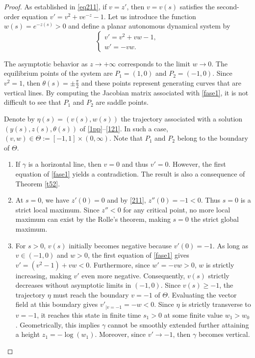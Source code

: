 \documentclass[a4paper,12pt]{amsart}
\theoremstyle{plain}
\theoremstyle{definition}
\begin{document}
\begin{proof} 
As established in \eqref{eq211}, if $v=z'$, then $v=v(s)$ satisfies the second-order equation $v' = v^2 + v e^{-z} - 1$. Let us introduce the function $w(s) = e^{-z(s)} > 0$ and define a planar autonomous dynamical system by 
\begin{equation}\label{fase1}
\begin{cases}
v' = v^2 + vw - 1, \\
w' = -vw.
\end{cases}
\end{equation}
 
 The asymptotic behavior as $z \to +\infty$ corresponds to the limit $w \to 0$. The equilibrium points of the system are $P_1 = (1, 0)$ and $P_2 = (-1, 0)$. Since $v^2=1$, then $\theta(s)=\pm\frac{\pi}{2}$ and these points represent generating curves that are vertical lines. By computing the Jacobian matrix associated with \eqref{fase1}, it is not difficult to see that $P_1$ and $P_2$ are saddle points. 
 


Denote by $\eta(s)=(v(s),w(s))$ the trajectory associated with a solution $(y(s),z(s),\theta(s))$ of \eqref{1pp}--\eqref{121}. In such a case, $(v,w)\in \Theta:=[-1,1]\times (0,\infty)$. Note that $P_1$ and $P_2$ belong to the boundary of $\Theta$.
\begin{enumerate}
\item If $\gamma$ is a horizontal line, then $v = 0$ and thus $v' = 0$. However, the first equation of \eqref{fase1} yields a contradiction. The result is also a consequence of Theorem \ref{t52}.
 \item At $s=0$, we have $z'(0)=0$ and by \eqref{211}, $z''(0)=-1<0$. Thus $s=0$ is a strict local maximum. Since $z''<0$ for any critical point, no more local maximum can exist by the Rolle's theorem, making $s=0$ the strict global maximum.
 
 
\item For $s > 0$, $v(s)$ initially becomes negative because $v'(0)=-1$. As long as $v \in (-1, 0)$ and $w > 0$, the first equation of \eqref{fase1} gives $v' = (v^2 - 1) + vw<0$. Furthermore, since $w' = -vw > 0$, $w$ is strictly increasing, making $v'$ even more negative. Consequently, $v(s)$ strictly decreases without asymptotic limits in $(-1, 0)$. Since $v(s) \ge -1$, the trajectory $\eta$ must reach the boundary $v = -1$ of $\Theta$. Evaluating the vector field at this boundary gives $v'_{|v=-1} = -w < 0$. Since $\eta$ is strictly transverse to $v=-1$, it reaches this state in finite time $s_1 > 0$ at some finite value $w_1 > w_0$. Geometrically, this implies $\gamma$ cannot be smoothly extended further attaining a height $z_1 = -\log(w_1)$. Moreover, since $v'\to -1$, then $\gamma$ becomes vertical.



\end{enumerate}
\end{proof}
\end{document}
